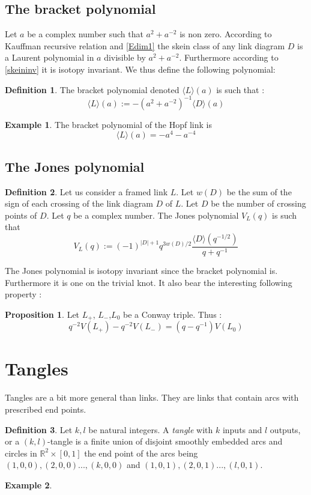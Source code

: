 \documentclass{article}
\theoremstyle{definition}
\newtheorem{Prop}{Proposition}[section]
\newtheorem{ex}{Example}[section]
\newtheorem{Def}{Definition}[section]
\begin{document}
\subsection{The bracket polynomial} Let $a$ be a complex number such that $a^2+a^{-2}$ is non zero. According to Kauffman recursive relation and \ref{Edim1} the skein class of any link diagram $D$ is a Laurent polynomial in $a$ divisible by $a^2+a^{-2}$. Furthermore according to \ref{skeininv} it is isotopy invariant. We thus define the following polynomial: 
\begin{Def} The bracket polynomial denoted $\langle L\rangle (a)$ is such that : $$\langle L\rangle (a):=-(a^2+a^{-2})^{-1}\langle D\rangle(a)$$
\end{Def}
\begin{ex} The bracket polynomial of the Hopf link is $$\langle L\rangle (a)=-a^4-a^{-4}$$ \vspace{5 cm}
\end{ex}
\subsection{The Jones polynomial}\begin{Def}
Let us consider a framed link $L$. Let $w(D)$ be the sum of the sign  of each crossing of the link diagram $D$ of $L$. Let $D$ be the number of crossing points of $D$. Let $q$ be a complex number. The Jones polynomial $V_{L}(q)$ is such that $$V_{L}(q):=(-1)^{|D|+1} q^{3w(D)/2}\frac{\langle D\rangle(q^{-1/2})}{q+q^{-1}}$$ 
\end{Def}
The Jones polynomial is isotopy invariant since the bracket polynomial is. Furthermore it is one on the trivial knot. It also bear the interesting following property :
\begin{Prop} Let $L_+$, $L_{-}$,$L_0$ be a Conway triple. Thus : $$q^{-2}V(L_{+})-q^{-2}V(L_{-})=(q-q^{-1})V(L_0)$$
\end{Prop}
\vspace{10cm}
\section{Tangles} Tangles are a bit more general than links. They are links that contain arcs with prescribed end points.
\begin{Def} Let $k,l$ be natural integers. A \textit{tangle} with $k$ inputs and $l$ outputs, or a $(k,l)$-tangle is a finite union of disjoint smoothly embedded arcs and circles in $\mathbb{R}^{2}\times [0,1]$ the end point of the arcs being $(1,0,0),(2,0,0)...,(k,0,0)$ and $(1,0,1),(2,0,1)...,(l,0,1)$.
\end{Def}
\begin{ex}
\vspace{10cm}

\end{ex}
\end{document}
